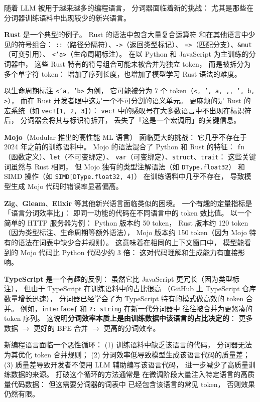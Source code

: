 随着 LLM 被用于越来越多的编程语言，
分词器面临着新的挑战：
尤其是那些在分词器训练语料中出现较少的新兴语言。

\textbf{Rust} 是一个典型的例子。
Rust 的语法中包含大量复合运算符
和在其他语言中少见的符号组合：
\texttt{::}（路径分隔符）、\texttt{->}（返回类型标记）、
\texttt{=>}（匹配分支）、\texttt{\&mut}（可变引用）、
\texttt{<'a>}（生命周期标注）。
在以 Python 和 JavaScript 为主训练的分词器中，
这些 Rust 特有的符号组合可能未被合并为独立 token，
而是被拆分为多个单字符 token：
增加了序列长度，也增加了模型学习 Rust 语法的难度。

以生命周期标注 \texttt{<'a, 'b>} 为例，
它可能被分为 7 个 token（\texttt{<, ', a, ,, ', b, >}），
而在 Rust 开发者眼中这是一个不可分割的语义单元。
更麻烦的是 Rust 的宏系统（如 \texttt{vec![1, 2, 3]}）：
\texttt{vec!} 中的感叹号在大多数语言中不出现在标识符后，
分词器会将其与标识符拆开，
丢失了「这是一个宏调用」的关键信息。

\textbf{Mojo}（Modular 推出的高性能 ML 语言）
面临更大的挑战：
它几乎不存在于 2024 年之前的训练语料中。
Mojo 的语法混合了 Python 和 Rust 的特征：
\texttt{fn}（函数定义）、\texttt{let}（不可变绑定）、
\texttt{var}（可变绑定）、\texttt{struct}、\texttt{trait}：
这些关键词虽然与 Rust 相同，
但 Mojo 独有的类型注解语法（如 \texttt{DType.float32}）
和 SIMD 操作（如 \texttt{SIMD[DType.float32, 4]}）
在训练语料中几乎不存在，
导致模型生成 Mojo 代码时错误率显著偏高。

\textbf{Zig}、\textbf{Gleam}、\textbf{Elixir} 等其他新兴语言面临类似的困境。
一个有趣的定量指标是「语言分词效率比」：
即同一功能的代码在不同语言中的 token 数比值。
以一个简单的 HTTP 服务器为例：
Python 版本约 50 token，
Rust 版本约 120 token（因为类型标注、生命周期等额外语法），
Mojo 版本约 150 token（因为 Mojo 特有的语法在词表中缺少合并规则）。
这意味着在相同的上下文窗口中，
模型能看到的 Mojo 代码比 Python 代码少约 3 倍：
这对代码理解和生成能力有直接影响。

\textbf{TypeScript} 是一个有趣的反例：
虽然它比 JavaScript 更冗长（因为类型标注），
但由于 TypeScript 在训练语料中的占比很高
（GitHub 上 TypeScript 仓库数量增长迅速），
分词器已经学会了为 TypeScript 特有的模式做高效的 token 合并。
例如，\texttt{interface\{} 和 \texttt{?: string} 在新一代分词器中
往往被合并为更紧凑的 token 序列。
这说明\textbf{分词效率本质上是由训练数据中该语言的占比决定的}：
更多数据 $\to$ 更好的 BPE 合并 $\to$ 更高的分词效率。

\begin{warnbox}[新语言的恶性循环]
新编程语言面临一个恶性循环：
(1) 训练语料中缺乏该语言的代码，
分词器无法为其优化 token 合并规则；
(2) 分词效率低导致模型生成该语言代码的质量差；
(3) 质量差导致开发者不使用 LLM 辅助编写该语言代码，
进一步减少了高质量训练数据的来源。
打破这个循环的方法通常是
在微调阶段大量注入特定语言的高质量代码数据：
但这需要分词器的词表中
已经包含该语言的常见 token，
否则效果仍然有限。
\end{warnbox}

